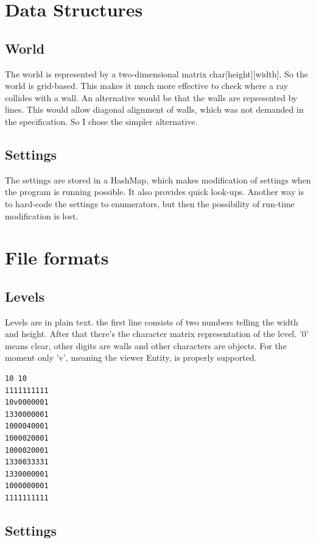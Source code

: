 \documentclass[a4paper,10pt]{article}
\begin{document}
\section{Data Structures}

\subsection{World}

The world is represented by a two-dimensional matrix
char{[}height{]}{[}width{]}. So the world is grid-based. This makes it much more
effective to check where a ray collides with a wall. An alternative would be
that the walls are represented by lines. This would allow diagonal alignment
of walls, which was not demanded in the specification. So I chose
the simpler alternative.

\subsection{Settings}

The settings are stored in a HashMap, which makes modification of
settings when the program is running possible. It also provides quick
look-ups. Another way is to hard-code the settings to enumerators,
but then the possibility of run-time modification is lost.

\section{File formats}

\subsection{Levels}

Levels are in plain text. the first line consists of two numbers telling the
width and height. After that there's the character matrix representation of the
level. '0' means clear, other digits are walls and other characters are
objects. For the moment only 'v', meaning the viewer Entity, is properly
supported.

\begin{verbatim}
10 10
1111111111
10v0000001
1330000001
1000040001
1000020001
1000020001
1330033331
1330000001
1000000001
1111111111
\end{verbatim}

\subsection{Settings}
\end{document}
